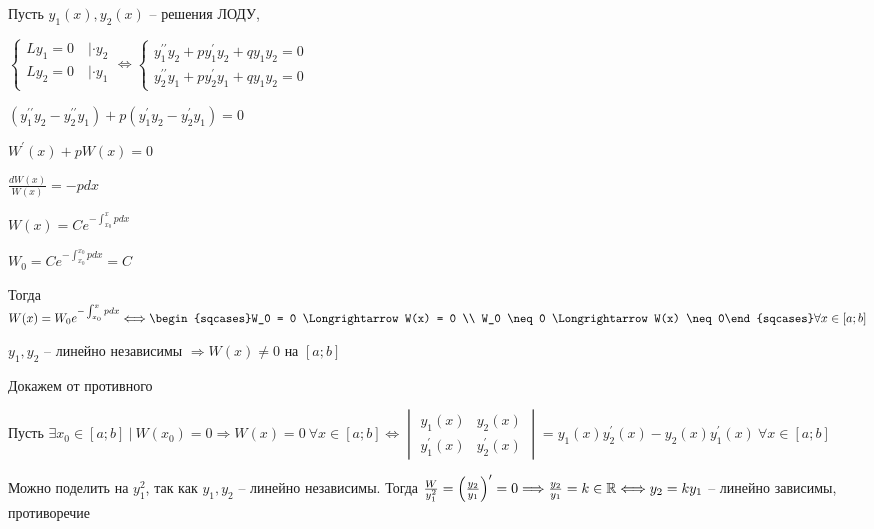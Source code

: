 \documentclass[12pt]{article}
\begin{document}
    \begin{MyProof}
        Пусть $y_1(x), y_2(x)$ -- решения ЛОДУ,

        $\begin{cases}
            Ly_1 = 0 \quad | \cdot y_2 \\
            Ly_2 = 0 \quad | \cdot y_1 \\
        \end{cases} \Longleftrightarrow
        \begin{cases}
            y_1^{\prime\prime} y_2 + py_1^{\prime} y_2 + q y_1 y_2 = 0 \\
            y_2^{\prime\prime} y_1 + py_2^{\prime} y_1 + q y_1 y_2 = 0
        \end{cases}$

        $(y_1^{\prime\prime} y_2 - y_2^{\prime\prime} y_1) + p (y_1^{\prime} y_2 - y_2^{\prime} y_1) = 0$

        $W^\prime(x) + pW(x) = 0$

        $\frac{dW(x)}{W(x)} = -pdx$

        $W(x) = Ce^{-\int_{x_0}^x pdx}$

        $W_0 = Ce^{-\int^{x_0}_{x_0} pdx} = C$

        Тогда $W(x) = W_0 e^{-\int_{x_0}^x pdx} \Longleftrightarrow \begin{sqcases}W_0 = 0 \Longrightarrow W(x) = 0 \\ W_0 \neq 0 \Longrightarrow W(x) \neq 0\end{sqcases} \forall x \in [a;b]$

    \end{MyProof}

    \begin{MyTheorem}
         $y_1, y_2$ -- линейно независимы $\Longrightarrow W(x) \neq 0$ на $[a;b]$
    \end{MyTheorem}

    \begin{MyProof} 
        Докажем от противного

        Пусть $\exists x_0 \in [a;b] \ | \ W(x_0)= 0 \Longrightarrow W(x) = 0 \ \forall x \in [a;b] \Longleftrightarrow
        \begin{vmatrix}y_1(x) & y_2(x) \\ y_1^\prime(x) & y_2^\prime(x)\end{vmatrix} = y_1(x) y_2^\prime(x) - y_2(x) y_1^\prime(x) \ \forall x \in [a;b]$

        Можно поделить на $y_1^2$, так как $y_1, y_2$ -- линейно независимы. Тогда $\frac{W}{y^2_1} = \left(\frac{y_2}{y_1}\right)^\prime = 0 \Longrightarrow \frac{y_2}{y_1} = k \in \mathbb{R} \Longleftrightarrow y_2 = k y_1$ -- линейно зависимы, противоречие
    \end{MyProof}
\end{document}

